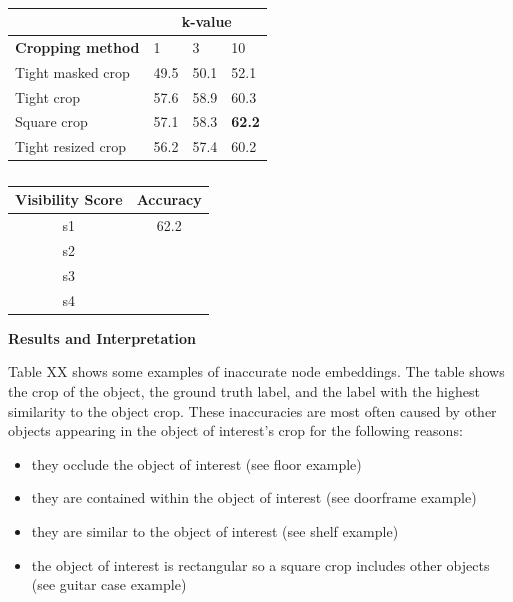 \begin{table}[h!]
    \centering
    \caption{}
    \begin{tabular}{l|lll|}
    \cline{2-4}
                                                   & \multicolumn{3}{c|}{\textbf{k-value}} \\ \hline
    \multicolumn{1}{|c|}{\textbf{Cropping method}} & 1        & 3       & 10               \\ \hline
    \multicolumn{1}{|l|}{Tight masked crop}        & 49.5     & 50.1    & 52.1             \\
    \multicolumn{1}{|l|}{Tight crop}               & 57.6     & 58.9    & 60.3             \\
    \multicolumn{1}{|l|}{Square crop}              & 57.1     & 58.3    & \textbf{62.2}    \\
    \multicolumn{1}{|l|}{Tight resized crop}       & 56.2     & 57.4    & 60.2             \\ \hline
    \end{tabular}
\end{table}
\begin{table}[h!]
    \centering
    \caption{}
    \begin{tabular}{|c|c|}
    \hline
    \textbf{Visibility Score} & \textbf{Accuracy} \\ \hline
    s1                       & 62.2               \\ \hline
    s2                        &                   \\ \hline
    s3                        &                   \\ \hline
    s4                        &                   \\ \hline
    \end{tabular}
\end{table}

\bigskip
\noindent
\textbf{Results and Interpretation}

Table XX shows some examples of inaccurate node embeddings. The table shows the crop of the object, the ground truth label, and the label with the highest similarity to the object crop. These inaccuracies are most often caused by other objects appearing in the object of interest's crop for the following reasons:
\begin{itemize}
    \item they occlude the object of interest (see floor example)
    \item they are contained within the object of interest (see doorframe example)
    \item they are similar to the object of interest (see shelf example)
    \item the object of interest is rectangular so a square crop includes other objects (see guitar case example)
\end{itemize}

